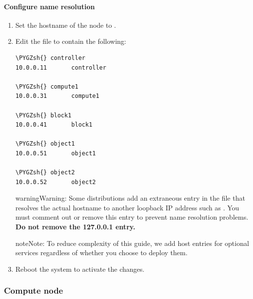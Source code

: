 \documentclass[letterpaper,10pt,english]{sphinxmanual}
\def\PYGZsh{\char`\#}
\begin{document}
\paragraph{Configure name resolution}
\label{_source/installation_guide/environment-networking-controller:configure-name-resolution}\begin{enumerate}
\item {} 
Set the hostname of the node to .

\item {} 
Edit the  file to contain the following:

\begin{Verbatim}[commandchars=\\\{\}]
\PYGZsh{} controller
10.0.0.11       controller

\PYGZsh{} compute1
10.0.0.31       compute1

\PYGZsh{} block1
10.0.0.41       block1

\PYGZsh{} object1
10.0.0.51       object1

\PYGZsh{} object2
10.0.0.52       object2
\end{Verbatim}

\begin{notice}{warning}{Warning:}
Some distributions add an extraneous entry in the 
file that resolves the actual hostname to another loopback IP
address such as . You must comment out or remove this
entry to prevent name resolution problems. \textbf{Do not remove the
127.0.0.1 entry.}
\end{notice}

\begin{notice}{note}{Note:}
To reduce complexity of this guide, we add host entries for optional
services regardless of whether you choose to deploy them.
\end{notice}

\item {} 
Reboot the system to activate the changes.

\end{enumerate}


\subsubsection{Compute node}
\label{_source/installation_guide/environment-networking-compute:compute-node}\label{_source/installation_guide/environment-networking-compute::doc}
\end{document}
